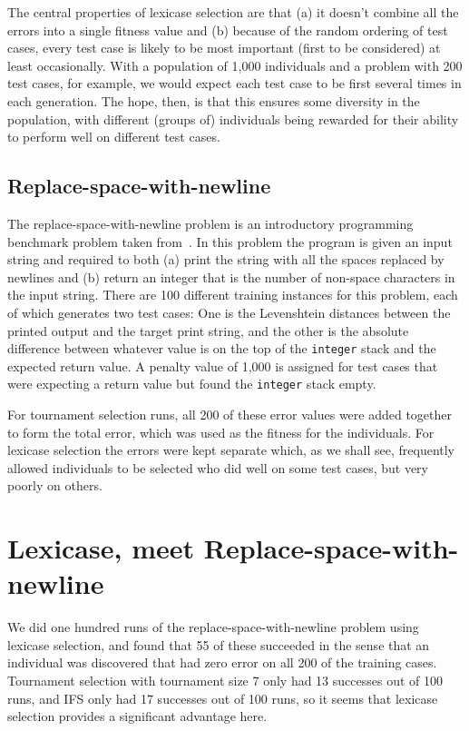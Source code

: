 The central properties of lexicase selection are that (a) it doesn't combine all the errors into a single
fitness value and (b) because of the random ordering of test cases, every test case is likely to be
most important (first to be considered) at least occasionally. With a population of 1,000 individuals
and a problem with 200 test cases, for example, we would expect each test case to be first several
times in each generation. The hope, then, is that this ensures some diversity in the population, with
different (groups of) individuals being rewarded for their ability to perform well on different test
cases.

\subsection{Replace-space-with-newline}

The replace-space-with-newline problem is an introductory programming benchmark problem taken
from~\cite{helmuth:GECCO15}. In this problem the program is given an input string and required to
both (a) print the string with all the spaces replaced by newlines and (b) return an integer that
is the number of non-space characters in the input string. There are 100 different training instances 
for this problem, each of which generates two test cases: One is the Levenshtein distances between
the printed output and the target print string, and the other is the absolute difference between
whatever value is on the top of the \texttt{integer} stack and the expected return value. A penalty
value of 1,000 is assigned for test cases that were expecting a return value but found the
\texttt{integer} stack empty.

For tournament selection runs, all 200 of these error values were added together to form the
total error, which was used as the fitness for the individuals. For lexicase selection the errors
were kept separate which, as we shall see, frequently allowed individuals to be selected who did 
well on some test cases, but very poorly on others.

\section{Lexicase, meet Replace-space-with-newline}
\label{sec:lexicaseRun}

We did one hundred runs of the replace-space-with-newline problem using lexicase selection, and
found that 55 of these succeeded in the sense that an individual was discovered that had zero
error on all 200 of the training cases. Tournament selection with tournament size 7 only
had 13 successes out of 100 runs, and IFS only had 17 successes out of 100 runs, so it seems that
lexicase selection provides a significant advantage here.

